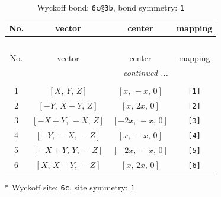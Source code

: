 \documentclass[fleqn,8pt]{jsarticle}
\begin{document}
\renewcommand{\arraystretch}{1.2}
\begin{longtable}{cccc}
\caption{Wyckoff bond: {\tt 6c@3b}, bond symmetry: {\tt 1}}
 \\
 \hline \hline
No. & vector & center & mapping \\ \hline \endfirsthead

\multicolumn{3}{l}{\tablename\ \thetable{}} \\
 \hline \hline
No. & vector & center & mapping \\ \hline \endhead

 \hline \hline
\multicolumn{3}{r}{\footnotesize\it continued ...} \\ \endfoot

 \hline \hline
\multicolumn{3}{r}{} \\ \endlastfoot

1 & $\left[ X,\, Y,\, Z \right]$ & $\left[ x,\, - x,\, 0 \right]$ & {\tt [1]} \\ \hline
2 & $\left[ - Y,\, X - Y,\, Z \right]$ & $\left[ x,\, 2 x,\, 0 \right]$ & {\tt [2]} \\ \hline
3 & $\left[ - X + Y,\, - X,\, Z \right]$ & $\left[ - 2 x,\, - x,\, 0 \right]$ & {\tt [3]} \\ \hline
4 & $\left[ - Y,\, - X,\, - Z \right]$ & $\left[ x,\, - x,\, 0 \right]$ & {\tt [4]} \\ \hline
5 & $\left[ - X + Y,\, Y,\, - Z \right]$ & $\left[ - 2 x,\, - x,\, 0 \right]$ & {\tt [5]} \\ \hline
6 & $\left[ X,\, X - Y,\, - Z \right]$ & $\left[ x,\, 2 x,\, 0 \right]$ & {\tt [6]} \\
\end{longtable}
* Wyckoff site: {\tt 6c}, site symmetry: {\tt 1}
\renewcommand{\arraystretch}{1.2}
\end{document}
